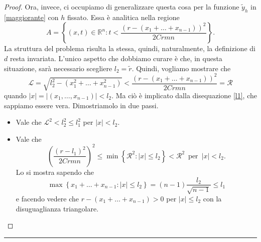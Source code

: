 \begin{proof}
Ora, invece, ci occupiamo di generalizzare questa cosa per la funzione $\widetilde{y}_h$ in \ref{maggiorante} con $h$ fissato. Essa è analitica nella regione 
$$A = \left\{ (x,t) \in \mathbb{R}^n : t<\frac{(r-(x_1+\ldots +x_{n-1}))^2}{2Crmn} \right\} .$$
La struttura del problema risulta la stessa, quindi, naturalmente, la definizione di $d$ resta invariata. L'unico aspetto che dobbiamo curare è che, in questa situazione, sarà necessario scegliere $l_2 =\widetilde{r}$. 
Quindi, vogliamo mostrare che $$\mathcal{L}=\sqrt{l_2^2-(x_1^2+\ldots +x_{n-1}^2)} < \frac{(r-(x_1+\ldots +x_{n-1}))^2}{2Crmn}=\mathcal{R}$$
quando $|x|=|(x_1,\ldots ,x_{n-1})|< l_2$. Ma ciò è implicato dalla disequazione \ref{l1}, che sappiamo essere vera. Dimostriamolo in due passi.
\begin{itemize}
\item Vale che $\mathcal{L}^2< l_2^2 \leq l_1^2$ per $|x|< l_2$.
\item Vale che $$\left(\frac{(r-l_1)^2}{2Crmn}\right)^2 \leq \min \left\{ \mathcal{R}^2 : |x|\leq l_2 \right\}< \mathcal{R}^2 \, \text{ per } \, |x|< l_2.$$
Lo si mostra sapendo che $$\max \left\{ x_1+\ldots +x_{n-1} : |x|\leq l_2\right\}= (n-1)\frac{l_2}{\sqrt{n-1}}\leq l_1$$ e facendo vedere che $r-(x_1+\ldots +x_{n-1})>0$ per $|x|\leq l_2$ con la disuguaglianza triangolare.
\qedhere
\end{itemize}
\end{proof}

\noindent\rule[0.5ex]{\linewidth}{0.2pt}


